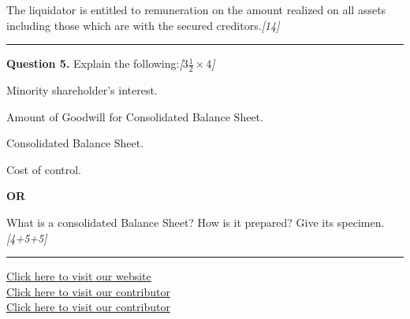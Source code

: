 \documentclass[11pt,a4paper]{article}
\newcommand{\pts}[1]{\hfill   \textit{[#1]}}
\begin{document}
The liquidator is entitled to remuneration on the amount realized on all assets including those which are with the secured creditors.\pts{14}

\medskip\rule{\linewidth}{0.2pt}




\noindent   \textbf{Question 5.}
Explain the following:\pts{$3\frac{1}{2}  \times 4$}

\begin{parts}
  \item Minority shareholder's interest.
  \item Amount of Goodwill for Consolidated Balance Sheet.
  \item Consolidated Balance Sheet.
  \item Cost of control.
\end{parts}

\centerline{   \textbf{OR}}

What is a consolidated Balance Sheet? How is it prepared? Give its specimen.\pts{4+5+5}

\vfill
\rule{\linewidth}{0.4pt}

\begin{center}\small
\href{https://bhu-exam.vercel.app/}{Click here to visit our website}\\[4pt]
\href{https://me-aryan.vercel.app/}{Click here to visit our contributor}\\[4pt]
\href{https://quashan-me.vercel.app/}{Click here to visit our contributor}
\end{center}
\end{document}
